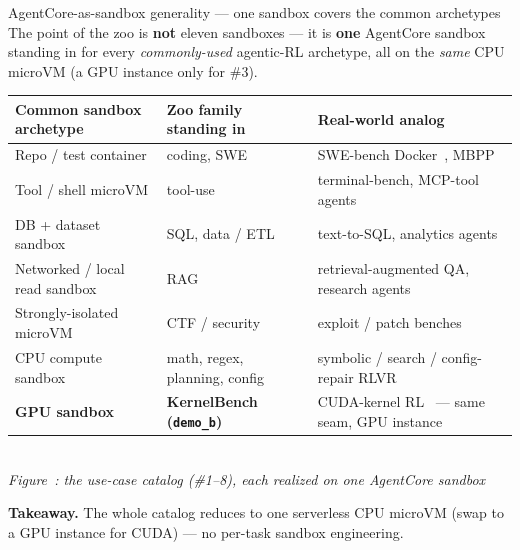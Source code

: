 \documentclass[aspectratio=169]{beamer}
\newcounter{deckfig}
\newcommand{\figtag}[1]{\refstepcounter{deckfig}%
  {\scriptsize\itshape Figure~\thedeckfig: #1}}
\begin{document}
\begin{frame}{AgentCore-as-sandbox generality --- one sandbox covers the common archetypes}
  \footnotesize The point of the zoo is \textbf{not} eleven sandboxes --- it is \textbf{one} AgentCore
  sandbox standing in for every \emph{commonly-used} agentic-RL archetype, all on the \emph{same} CPU
  microVM (a GPU instance only for \#3).
  \begin{center}
  \renewcommand{\arraystretch}{0.5}\scriptsize
  \begin{tabular}{@{}p{3.5cm}p{3.3cm}p{4.2cm}@{}}
    \toprule
    \textbf{Common sandbox archetype} & \textbf{Zoo family standing in} & \textbf{Real-world analog} \\
    \midrule
    Repo / test container & coding, SWE & SWE-bench Docker~\cite{swebench}, MBPP~\cite{mbpp} \\
    Tool / shell microVM & tool-use & terminal-bench, MCP-tool agents \\
    DB + dataset sandbox & SQL, data / ETL & text-to-SQL, analytics agents \\
    Networked / local read sandbox & RAG & retrieval-augmented QA, research agents \\
    Strongly-isolated microVM & CTF / security & exploit / patch benches \\
    CPU compute sandbox & math, regex, planning, config & symbolic / search / config-repair RLVR \\
    \midrule
    \textbf{GPU sandbox} & \textbf{KernelBench (\texttt{demo\_b})} & CUDA-kernel RL~\cite{kernelbench} --- same seam, GPU instance \\
    \bottomrule
  \end{tabular}
  \\\figtag{the use-case catalog (\#1--8), each realized on \emph{one} AgentCore sandbox}
  \end{center}
  \vspace{-0.4em}
  {\scriptsize \textbf{Takeaway.} The whole catalog reduces to one serverless CPU microVM (swap to a
  GPU instance for CUDA) --- no per-task sandbox engineering.}
\end{frame}
\end{document}
